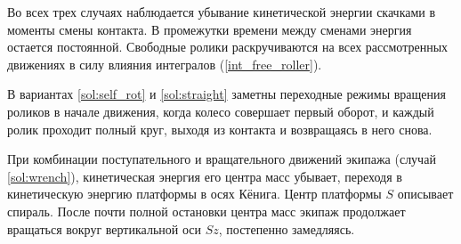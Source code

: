 Во всех трех случаях наблюдается убывание кинетической энергии скачками в моменты смены контакта. В промежутки времени между сменами энергия остается постоянной.
Свободные ролики раскручиваются на всех рассмотренных движениях в силу влияния интегралов (\ref{int_free_roller}).

В вариантах \ref{sol:self_rot} и \ref{sol:straight} заметны переходные режимы вращения роликов в начале движения, когда колесо совершает первый оборот, и каждый ролик проходит полный круг, выходя из контакта и возвращаясь в него снова.

При комбинации поступательного и вращательного движений экипажа (случай \ref{sol:wrench}), кинетическая энергия его центра масс убывает, переходя в кинетическую энергию платформы в осях Кёнига. Центр платформы $S$ описывает спираль. После почти полной остановки центра масс экипаж продолжает вращаться вокруг вертикальной оси $Sz$, постепенно замедляясь.

